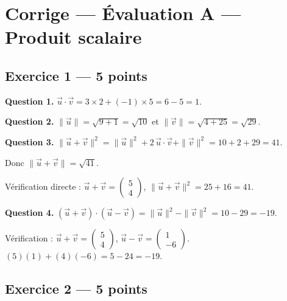 
\section*{Corrige — Évaluation A — Produit scalaire}

\subsection*{Exercice 1 — 5 points}


\textbf{Question 1.}
$\vec{u} \cdot \vec{v} = 3 \times 2 + (-1) \times 5 = 6 - 5 = 1$.

\textbf{Question 2.}
$\|\vec{u}\| = \sqrt{9 + 1} = \sqrt{10}$ et $\|\vec{v}\| = \sqrt{4 + 25} = \sqrt{29}$.

\textbf{Question 3.}
$\|\vec{u} + \vec{v}\|^2 = \|\vec{u}\|^2 + 2\,\vec{u} \cdot \vec{v} + \|\vec{v}\|^2 = 10 + 2 + 29 = 41$.

Donc $\|\vec{u} + \vec{v}\| = \sqrt{41}$.

Vérification directe : $\vec{u} + \vec{v} = \begin{pmatrix} 5 \\ 4 \end{pmatrix}$, $\|\vec{u} + \vec{v}\|^2 = 25 + 16 = 41$. \checkmark

\textbf{Question 4.}
$(\vec{u} + \vec{v}) \cdot (\vec{u} - \vec{v}) = \|\vec{u}\|^2 - \|\vec{v}\|^2 = 10 - 29 = -19$.

Vérification : $\vec{u} + \vec{v} = \begin{pmatrix} 5 \\ 4 \end{pmatrix}$, $\vec{u} - \vec{v} = \begin{pmatrix} 1 \\ -6 \end{pmatrix}$. $(5)(1) + (4)(-6) = 5 - 24 = -19$. \checkmark

\subsection*{Exercice 2 — 5 points}

